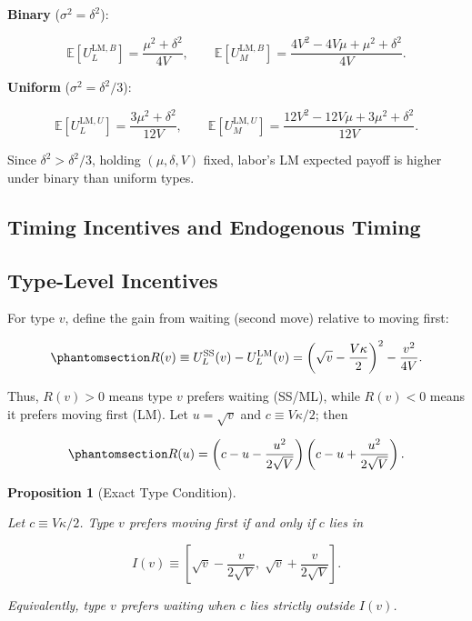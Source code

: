 \documentclass[
  english,
  a4paper,
  12pt]{article}
\newcommand{\E}{\mathbb{E}}
\theoremstyle{plain}
\newtheorem{proposition}{Proposition}[section]
\theoremstyle{plain}
\theoremstyle{definition}
\theoremstyle{remark}
\begin{document}
\textbf{Binary} (\(\sigma^2=\delta^2\)):

\[
\E\!\left[U_L^{\mathrm{LM},B}\right]
  = \frac{\mu^2 + \delta^2}{4V},
\qquad
\E\!\left[U_M^{\mathrm{LM},B}\right]
  = \frac{4V^2 - 4V\mu + \mu^2 + \delta^2}{4V}.
\]

\textbf{Uniform} (\(\sigma^2=\delta^2/3\)):

\[
\E\!\left[U_L^{\mathrm{LM},U}\right]
  = \frac{3\mu^2 + \delta^2}{12V},
\qquad
\E\!\left[U_M^{\mathrm{LM},U}\right]
  = \frac{12V^2 - 12V\mu + 3\mu^2 + \delta^2}{12V}.
\]

Since \(\delta^2>\delta^2/3\), holding \((\mu,\delta,V)\) fixed, labor's
LM expected payoff is higher under binary than uniform types.

\subsection{Timing Incentives and Endogenous Timing}\label{sec-timing}

\subsection{Type-Level Incentives}\label{type-level-incentives}

For type \(v\), define the gain from waiting (second move) relative to
moving first:

\begin{equation}\phantomsection\label{eq-rent-function}{
R(v) \equiv U_L^{\mathrm{SS}}(v) - U_L^{\mathrm{LM}}(v)
  = \left(\sqrt{v} - \frac{V\kappa}{2}\right)^2 - \frac{v^2}{4V}.
}\end{equation}

Thus, \(R(v)>0\) means type \(v\) prefers waiting (SS/ML), while
\(R(v)<0\) means it prefers moving first (LM). Let \(u=\sqrt v\) and
\(c\equiv V\kappa/2\); then

\begin{equation}\phantomsection\label{eq-rent-factored}{
R(u)
=
\left(c-u-\frac{u^2}{2\sqrt V}\right)
\left(c-u+\frac{u^2}{2\sqrt V}\right).
}\end{equation}

\begin{proposition}[Exact Type
Condition]\protect\hypertarget{prp-exact-condition}{}\label{prp-exact-condition}

Let \(c\equiv V\kappa/2\). Type \(v\) prefers moving first if and only
if \(c\) lies in

\[
I(v)
\equiv
\left[\sqrt v-\frac{v}{2\sqrt V},\;\sqrt v+\frac{v}{2\sqrt V}\right].
\]

Equivalently, type \(v\) prefers waiting when \(c\) lies strictly
outside \(I(v)\).

\end{proposition}
\end{document}
